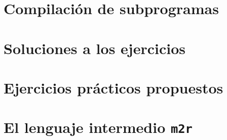 \documentclass[a4paper,11pt,titlepage]{book}
\newcommand{\echapter}{\newpage\thispagestyle{empty}}
\begin{document}
\chapter{Compilación de subprogramas}

\echapter

\appendix
\chapter{Soluciones a los ejercicios} \label{app:soleje}
\setcounter{contcapitulo}{1}   %
\clearpage
\clearpage
\clearpage
\clearpage
\clearpage
\clearpage
\clearpage

\echapter

\chapter{Ejercicios prácticos propuestos} \label{app:prac}

\echapter

\chapter{El lenguaje intermedio \texttt{m2r}} \label{app:mdosr}

\echapter

\begin{thebibliography}{} 

\end{thebibliography}
\end{document}

